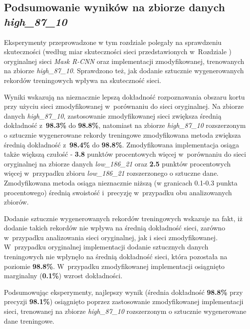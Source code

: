 \subsection{Podsumowanie wyników na zbiorze danych \textit{high\_87\_10}}
Eksperymenty przeprowadzone w tym rozdziale polegały na sprawdzeniu skuteczności (według miar skuteczności sieci przedstawionych w~Rozdziale ) oryginalnej sieci \textit{Mask R-CNN} oraz implementacji zmodyfikowanej, trenowanych na zbiorze \textit{high\_87\_10}.
Sprawdzono też, jak dodanie sztucznie wygenerowanych rekordów treningowych wpływa na skuteczność sieci.

Wyniki wskazują na nieznacznie lepszą dokładność rozpoznawania obszaru kortu przy użyciu sieci zmodyfikowanej w~porównaniu do sieci oryginalnej.
Na zbiorze danych \textit{high\_87\_10}, zastosowanie zmodyfikowanej sieci zwiększa średnią dokładność z~\textbf{98.3\%} do \textbf{98.8\%}, natomiast na zbiorze \textit{high\_87\_10} rozszerzonym o sztucznie wygenerowane rekordy treningowe zmodyfikowana metoda zwiększa średnią dokładność z~\textbf{98.4\%} do \textbf{98.8\%}. 
Zmodyfikowana implementacja osiąga także większą czułość - \textbf{3.8} punktów procentowych więcej w~porównaniu do sieci oryginalnej na zbiorze danych \textit{low\_186\_21} oraz \textbf{2.5} punktów procentowych więcej w~przypadku zbioru \textit{low\_186\_21} rozszerzonego o sztuczne dane.
Zmodyfikowana metoda osiąga nieznacznie niższą (w granicach 0.1-0.3 punkta procentowego) średnią swoistość i~precyzję w~przypadku obu analizowanych zbiorów.


Dodanie sztucznie wygenerowanych rekordów treningowych wskazuje na fakt, iż dodanie takich rekordów nie wpływa na średnią dokładność sieci, zarówno w~przypadku analizowania sieci oryginalnej, jak i sieci zmodyfikowanej. W~przypadku oryginalnej implementacji dodanie sztucznych danych treningowych nie wpłynęło na średnią dokładność sieci, która pozostała na poziomie \textbf{98.8\%}. W~przypadku zmodyfikowanej implementacji osiągnięto marginalny (\textbf{0.1\%}) wzrost dokładności.


Podsumowując eksperymenty, najlepszy wynik (średnia dokładność \textbf{98.8\%} przy precyzji \textbf{98.1\%}) osiągnięto poprzez zastosowanie zmodyfikowanej implementacji sieci, trenowanej na zbiorze \textit{high\_87\_10} rozszerzonym o sztucznie wygenerowane dane treningowe.
